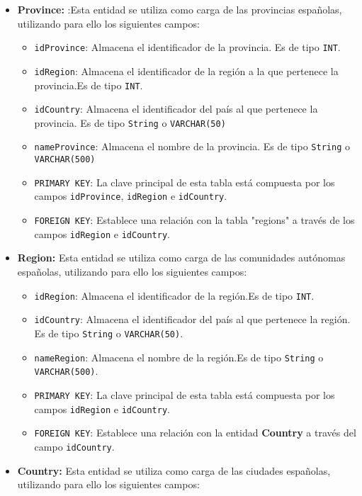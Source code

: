 \begin{itemize}
      \item \textbf{Province: }:Esta entidad se utiliza como carga de las provincias españolas, utilizando para ello los siguientes campos:
      \begin{itemize}
        \item \texttt{idProvince}: Almacena el identificador de la provincia. Es de tipo \texttt{INT}.
        \item \texttt{idRegion}: Almacena el identificador de la región a la que pertenece la provincia.Es de tipo \texttt{INT}.
        \item \texttt{idCountry}: Almacena el identificador del país al que pertenece la provincia. Es de tipo \texttt{String} o \texttt{VARCHAR(50)}
        \item \texttt{nameProvince}: Almacena el nombre de la provincia. Es de tipo \texttt{String} o \texttt{VARCHAR(500)}
        \item \texttt{PRIMARY KEY}: La clave principal de esta tabla está compuesta por los campos \texttt{idProvince}, \texttt{idRegion} e \texttt{idCountry}.
        \item \texttt{FOREIGN KEY}: Establece una relación con la tabla "regions" a través de los campos \texttt{idRegion} e \texttt{idCountry}.
      \end{itemize}
    \item \textbf{Region: }Esta entidad se utiliza como carga de las comunidades autónomas españolas, utilizando para ello los siguientes campos:
    \begin{itemize}
      \item \texttt{idRegion}: Almacena el identificador de la región.Es de tipo \texttt{INT}.
      \item \texttt{idCountry}: Almacena el identificador del país al que pertenece la región. Es de tipo \texttt{String} o \texttt{VARCHAR(50)}.
      \item \texttt{nameRegion}: Almacena el nombre de la región.Es de tipo \texttt{String} o \texttt{VARCHAR(500)}.
      \item \texttt{PRIMARY KEY}: La clave principal de esta tabla está compuesta por los campos \texttt{idRegion} e \texttt{idCountry}.
      \item \texttt{FOREIGN KEY}: Establece una relación con la entidad \textbf{Country} a través del campo \texttt{idCountry}.
    \end{itemize}
    \item \textbf{Country: }Esta entidad se utiliza como carga de las ciudades españolas, utilizando para ello los siguientes campos:

\end{itemize}
